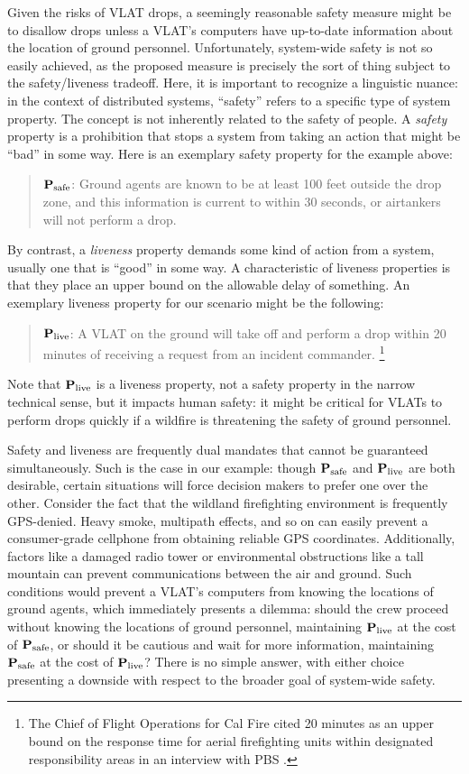 \documentclass[]             %
{NASA}                       %
\theoremstyle{definition}
\begin{document}
Given the risks of VLAT drops, a seemingly reasonable safety measure
might be to disallow drops unless a VLAT's computers have up-to-date
information about the location of ground personnel. Unfortunately,
system-wide safety is not so easily achieved, as the proposed measure
is precisely the sort of thing subject to the safety/liveness
tradeoff. Here, it is important to recognize a linguistic nuance: in
the context of distributed systems, ``safety'' refers to a specific
type of system property. The concept is not inherently related to the
safety of people. A \emph{safety} property is a prohibition that stops
a system from taking an action that might be ``bad'' in some way. Here
is an exemplary safety property for the example above:
\begin{quote}
  $\textbf{P}_\textrm{safe}$: Ground agents are known to be at least
  100 feet outside the drop zone, and this information is current to
  within 30 seconds, or airtankers will not perform a drop.
\end{quote}
By contrast, a \emph{liveness} property demands some kind of action
from a system, usually one that is ``good'' in some way. A
characteristic of liveness properties is that they place an upper
bound on the allowable delay of something. An exemplary liveness
property for our scenario might be the following:
\begin{quote}
  $\textbf{P}_\textrm{live}$: A VLAT on the ground will take off and
  perform a drop within 20 minutes of receiving a request from an
  incident commander. \footnote{The Chief of Flight Operations for Cal
    Fire cited 20 minutes as an upper bound on the response time for
    aerial firefighting units within designated responsibility areas
    in an interview with PBS \cite{2021:aerialfirefighting}.}
\end{quote} Note that $\textbf{P}_\textrm{live}$
is a liveness property, not a safety property in the narrow technical
sense, but it impacts human safety: it might be critical for VLATs to
perform drops quickly if a wildfire is threatening the safety of
ground personnel.

Safety and liveness are frequently dual mandates that cannot be
guaranteed simultaneously. Such is the case in our example: though
$\textbf{P}_\textrm{safe}$ and $\textbf{P}_\textrm{live}$ are both desirable, certain situations will
force decision makers to prefer one over the other. Consider the fact
that the wildland firefighting environment is frequently GPS-denied.
Heavy smoke, multipath effects, and so on can easily prevent a
consumer-grade cellphone from obtaining reliable GPS
coordinates. Additionally, factors like a damaged radio tower or
environmental obstructions like a tall mountain can prevent
communications between the air and ground. Such conditions would
prevent a VLAT's computers from knowing the locations of ground
agents, which immediately presents a dilemma: should the crew proceed
without knowing the locations of ground personnel, maintaining
$\textbf{P}_\textrm{live}$ at the cost of $\textbf{P}_\textrm{safe}$, or should it be cautious and wait
for more information, maintaining $\textbf{P}_\textrm{safe}$ at the cost of $\textbf{P}_\textrm{live}$?
There is no simple answer, with either choice presenting a downside
with respect to the broader goal of system-wide safety.
\end{document}
